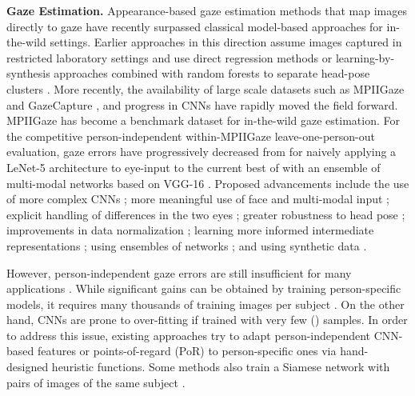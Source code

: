 \documentclass[10pt,twocolumn,letterpaper]{article}
\newcommand{\Paragraph}[1]
{\vspace{1.5mm} \noindent \textbf{#1}}
\begin{document}
\Paragraph{Gaze Estimation.}
Appearance-based gaze estimation \cite{Tan2002WACV} methods that map images directly to gaze have recently surpassed classical model-based approaches \cite{Hansen2010TPAMI} for in-the-wild settings. 
Earlier approaches in this direction assume images captured in restricted laboratory settings and use direct regression methods \cite{Lu2011ICCV,Lu2011BMVC} or learning-by-synthesis approaches combined with random forests to separate head-pose clusters \cite{Sugano2014CVPR}. 
More recently, the availability of large scale datasets such as MPIIGaze \cite{Zhang2015CVPR} and GazeCapture \cite{Krafka2016CVPR}, and progress in CNNs have rapidly moved the field forward. MPIIGaze has become a benchmark dataset for in-the-wild gaze estimation. For the competitive person-independent within-MPIIGaze leave-one-person-out evaluation, gaze errors have progressively decreased from  for naively applying a LeNet-5 architecture to eye-input \cite{Zhang2015CVPR} to the current best of  with an ensemble of multi-modal networks based on VGG-16 \cite{Fischer2018ECCV}.
Proposed advancements include the use of more complex CNNs \cite{Zhang2019TPAMI}; more meaningful use of face \cite{Zhang2017CVPRW, Krafka2016CVPR} and multi-modal input \cite{Krafka2016CVPR,Fischer2018ECCV,Yu2018ECCVW}; explicit handling of differences in the two eyes \cite{Cheng2018ECCV}; greater robustness to head pose \cite{zhu2017monocular, Ranjan2018CVPRW}; improvements in data normalization \cite{Zhang2018ETRA}; learning more informed intermediate representations \cite{Park2018ECCV}; using ensembles of networks \cite{Fischer2018ECCV}; and using synthetic data \cite{Shrivastava2017CVPR, Wang2018CVPR,Lee2018ICLR, Park2018ETRA, Ranjan2018CVPRW}. 

However, person-independent gaze errors are still insufficient for many applications \cite{Biedert2010CHIEA,Sibert2000UIST,Huang2016MM,Betke2002TNSRE}. While significant gains can be obtained by training person-specific models, it requires many thousands of training images per subject \cite{Zhang2019TPAMI}. On the other hand, CNNs are prone to over-fitting  if trained with very few () samples. In order to address this issue, existing approaches try to adapt person-independent CNN-based features \cite{Krafka2016CVPR, Park2018ETRA} or points-of-regard (PoR) \cite{Zhang2019CHI} to person-specific ones via hand-designed heuristic functions. Some methods also train a Siamese network with pairs of images of the same subject \cite{Liu2018BMVC}. 
\end{document}
